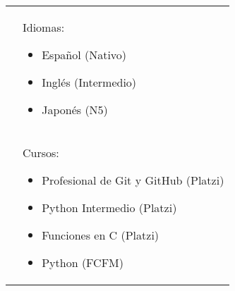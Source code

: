 \documentclass[twoside,letter,openright,10pt]{report}
\begin{document}
\begin{table}[hbt!]
\begin{tabular}{p{40mm}p{140mm}}
& Idiomas:
\begin{itemize}[noitemsep,nolistsep]
\item Español (Nativo)
\item Inglés (Intermedio)
\item Japonés (N5)
\vspace{-4mm}
\end{itemize}
\\
& Cursos:
\begin{itemize}[noitemsep,nolistsep]
\item Profesional de Git y GitHub (Platzi)
\item Python Intermedio (Platzi)
\item Funciones en C (Platzi)
\item Python (FCFM)
\vspace{-4mm}
\end{itemize}
\end{tabular}
\end{table}
\end{document}
